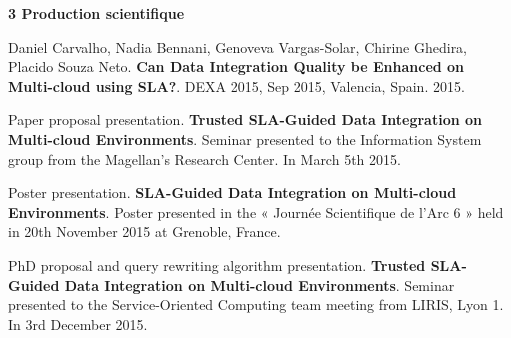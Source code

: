 \documentclass[11pt,a4paper,oneside]{report}
\begin{document}

\newpage
\begin{flushleft}
\textbf{3 Production scientifique}\\
\end{flushleft}

\noindent
Daniel Carvalho, Nadia Bennani, Genoveva Vargas-Solar, Chirine Ghedira, Placido Souza Neto. \textbf{Can Data Integration Quality be Enhanced on Multi-cloud using SLA?}. DEXA 2015, Sep 2015, Valencia, Spain. 2015.
\bigskip

\noindent
Paper proposal presentation. \textbf{Trusted SLA-Guided Data Integration on Multi-cloud Environments}. Seminar presented to the Information System group from the Magellan’s Research Center. In March 5th 2015.
\bigskip

%
%

\noindent
Poster presentation. \textbf{SLA-Guided Data Integration on Multi-cloud Environments}. Poster presented in the « Journée Scientifique de l'Arc 6 » held in 20th November 2015 at Grenoble, France. 
\bigskip

\noindent
PhD proposal and query rewriting algorithm presentation. \textbf{Trusted SLA-Guided Data Integration on Multi-cloud Environments}. Seminar presented to the Service-Oriented Computing team meeting from LIRIS, Lyon 1. In 3rd December 2015.
\bigskip
\end{document}
